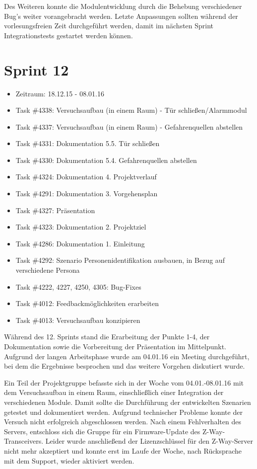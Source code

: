 \documentclass[12pt, oneside, smallheadings]{scrbook}
\begin{document}
Des Weiteren konnte die Modulentwicklung durch die Behebung verschiedener Bug's weiter vorangebracht werden. Letzte Anpassungen sollten während der vorlesungsfreien Zeit durchgeführt werden, damit im nächsten Sprint Integrationstests gestartet werden können.

\section{Sprint 12}
\begin{itemize}
	\item Zeitraum: 18.12.15 - 08.01.16 \newline
	\item Task \#4338: Versuchsaufbau (in einem Raum) - Tür schließen/Alarmmodul
	\item Task \#4337: Versuchsaufbau (in einem Raum) - Gefahrenquellen abstellen
	\item Task \#4331: Dokumentation 5.5. Tür schließen
	\item Task \#4330: Dokumentation 5.4. Gefahrenquellen abstellen
	\item Task \#4324: Dokumentation 4. Projektverlauf
	\item Task \#4291: Dokumentation 3. Vorgehensplan
	\item Task \#4327: Präsentation
	\item Task \#4323: Dokumentation 2. Projektziel
	\item Task \#4286: Dokumentation 1. Einleitung
	\item Task \#4292: Szenario Personenidentifikation ausbauen, in Bezug auf verschiedene Persona
	\item Task \#4222, 4227, 4250, 4305: Bug-Fixes
	\item Task \#4012: Feedbackmöglichkeiten erarbeiten
	\item Task \#4013: Versuchsaufbau konzipieren\\
\end{itemize}
\noindent
Während des 12. Sprints stand die Erarbeitung der Punkte 1-4, der Dokumentation sowie die Vorbereitung der Präsentation im Mittelpunkt. Aufgrund der langen Arbeitsphase wurde am 04.01.16 ein Meeting durchgeführt, bei dem die Ergebnisse besprochen und das weitere Vorgehen diskutiert wurde.

Ein Teil der Projektgruppe befasste sich in der Woche vom 04.01.-08.01.16 mit dem Versuchsaufbau in einem Raum, einschließlich einer Integration der verschiedenen Module. Damit sollte die Durchführung der entwickelten Szenarien getestet und dokumentiert werden. Aufgrund technischer Probleme konnte der Versuch nicht erfolgreich abgeschlossen werden. Nach einem Fehlverhalten des Servers, entschloss sich die Gruppe für ein Firmware-Update des Z-Way-Transceivers. Leider wurde anschließend der Lizenzschlüssel für den Z-Way-Server nicht mehr akzeptiert und konnte erst im Laufe der Woche, nach Rücksprache mit dem Support, wieder aktiviert werden.
\end{document}
